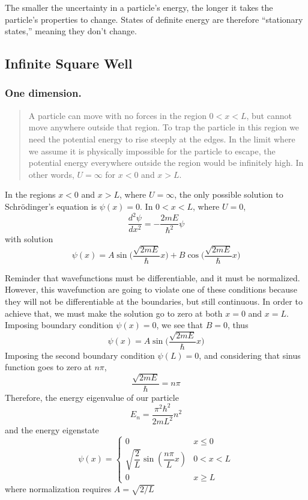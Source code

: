 \documentclass[../../../main.tex]{subfiles}
\begin{document}
The smaller the uncertainty in a particle's energy, the longer it takes the particle's properties to change. States of definite energy are therefore “stationary states,” meaning they don't change.

\subsection{Infinite Square Well}
\subsubsection{One dimension.} \begin{quote}
    A particle can move with no forces in the region $0 < x < L$, but cannot move anywhere outside that region. To trap the particle in this region we need the potential energy to rise steeply at the edges. In the limit where we assume it is physically impossible for the particle to escape, the potential energy everywhere outside the region would be infinitely high. In other words, $U=\infty$ for $x < 0$ and $x > L$.
\end{quote} 
In the regions $x < 0$ and $x > L$, where $U = \infty$, the only possible solution to Schrödinger's equation is $\psi(x) = 0$. In $0 < x < L$, where $ U = 0$, 
\begin{equation*}
    \frac{d^2\psi}{dx^2}=-\frac{2mE}{\hbar^2}\psi
\end{equation*}
with solution
\begin{equation*}
    \psi(x)=A\sin \biggl(\frac{\sqrt{2mE}}{\hbar} x\biggr)+ B \cos \biggl(\frac{\sqrt{2mE}}{\hbar} x\biggr)
\end{equation*}

Reminder that wavefunctions must be differentiable, and it must be normalized. However, this wavefunction are going to violate one of these conditions because they will not be differentiable at the boundaries, but still continuous. In order to achieve that, we must make the solution go to zero at both $x = 0$ and $x = L$. Imposing boundary condition $\psi(x)=0$, we see that $B=0$, thus
\begin{equation*}
    \psi(x)=A\sin \biggl(\frac{\sqrt{2mE}}{\hbar} x\biggr)
\end{equation*}
Imposing the second boundary condition $\psi(L)=0$, and considering that sinus function goes to zero at $n\pi$, 
\begin{equation*}
    \frac{\sqrt{2mE}}{\hbar}=n\pi
\end{equation*}
Therefore, the energy eigenvalue of our particle 
\begin{equation*}
    E_n=\frac{\pi^2\hbar^2}{2mL^2}n^2
\end{equation*}
and the energy eigenstate
\begin{equation*}
    \psi(x)=\begin{cases}
        0&x\leq 0\\
        \sqrt{\dfrac{2}{L}}\sin( \dfrac{n\pi}{L}x)& 0 < x < L\\
        0&x\geq L
    \end{cases}
\end{equation*}
where normalization requires $A = \sqrt{2/L}$
\end{document}
